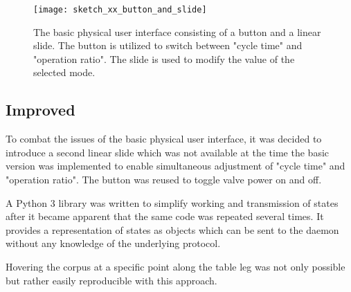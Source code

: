 \begin{figure}[H]
\centering

\texttt{[image: sketch\_xx\_button\_and\_slide]}


\caption{The basic physical user interface consisting of a button and a linear slide. The button is utilized to switch between "cycle time" and "operation ratio". The slide is used to modify the value of the selected mode.}
\end{figure}

\subsection{Improved}
To combat the issues of the basic physical user interface, it was decided to introduce a second linear slide which was not available at the time the basic version was implemented to enable simultaneous adjustment of "cycle time" and "operation ratio". The button was reused to toggle valve power on and off.

A Python 3 library was written to simplify working and transmission of states after it became apparent that the same code was repeated several times. It provides a representation of states as objects which can be sent to the daemon without any knowledge of the underlying protocol. 

Hovering the corpus at a specific point along the table leg was not only possible but rather easily reproducible with this approach.  